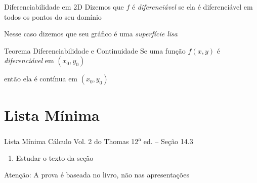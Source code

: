 \begin{frame}{Diferenciabilidade em 2D}
  Dizemos que $f$ é \emph{diferenciável}
  se ela é diferenciável em todos os
  pontos do seu domínio

  \pause
  \vspace{0.5\baselineskip}
  Nesse caso dizemos que seu gráfico é uma \emph{superfície lisa}
\end{frame}

\begin{frame}{Teorema Diferenciabilidade e Continuidade}
    Se uma função $f(x, y)$ é \emph{diferenciável} em \((x_0, y_0)\)

    \pause
    \vspace{0.5\baselineskip}
    então ela é contínua em \((x_0, y_0)\)
\end{frame}

\section{Lista Mínima}

\begin{frame}{Lista Mínima}
  Cálculo Vol. 2 do Thomas 12\textsuperscript{a} ed. -- Seção 14.3
  \begin{enumerate}
    \item Estudar o texto da seção
  \end{enumerate}

  \vfill
  Atenção: A prova é baseada no livro, não nas apresentações
\end{frame}


